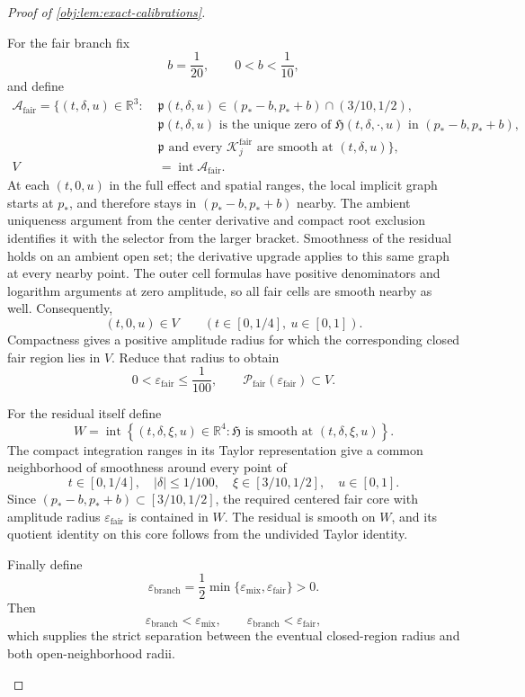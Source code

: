 \documentclass[11pt]{article}
\begin{document}
\begin{proof}[Proof of \cref{obj:lem:exact-calibrations}]
\begin{enumerate}
For the fair branch fix
\[
b=\frac1{20},\qquad 0<b<\frac1{10},
\]
and define
\[
\begin{aligned}
\mathcal A_{\mathrm{fair}}
=\bigl\{(t,\delta,u)\in\mathbb R^3:\;&
\mathfrak p(t,\delta,u)\in(p_*-b,p_*+b)\cap(3/10,1/2),\\
&\mathfrak p(t,\delta,u)
\text{ is the unique zero of }
\mathfrak H(t,\delta,\cdot,u)
\text{ in }(p_*-b,p_*+b),\\
&\mathfrak p\text{ and every }\mathcal K^{\mathrm{fair}}_j
\text{ are smooth at }(t,\delta,u)\bigr\},\\
V&=\operatorname{int}\mathcal A_{\mathrm{fair}}.
\end{aligned}
\]
At each \((t,0,u)\) in the full effect and spatial ranges, the local implicit graph starts at \(p_*\), and therefore stays in
\((p_*-b,p_*+b)\) nearby. The ambient uniqueness argument from the center derivative and compact root exclusion identifies it with the selector from the larger bracket. Smoothness of the residual holds on an ambient open set; the derivative upgrade applies to this same graph at every nearby point. The outer cell formulas have positive denominators and logarithm arguments at zero amplitude, so all fair cells are smooth nearby as well. Consequently,
\[
(t,0,u)\in V
\qquad(t\in[0,1/4],\ u\in[0,1]).
\]
Compactness gives a positive amplitude radius for which the corresponding closed fair region lies in \(V\). Reduce that radius to obtain
\[
0<\varepsilon_{\mathrm{fair}}\le\frac1{100},
\qquad
\mathcal P_{\mathrm{fair}}(\varepsilon_{\mathrm{fair}})\subset V.
\]

For the residual itself define
\[
W=
\operatorname{int}
\left\{
(t,\delta,\xi,u)\in\mathbb R^4:
\mathfrak H\text{ is smooth at }(t,\delta,\xi,u)
\right\}.
\]
The compact integration ranges in its Taylor representation give a common neighborhood of smoothness around every point of
\[
t\in[0,1/4],\quad |\delta|\le1/100,\quad
\xi\in[3/10,1/2],\quad u\in[0,1].
\]
Since
\((p_*-b,p_*+b)\subset[3/10,1/2]\), the required centered fair core with amplitude radius \(\varepsilon_{\mathrm{fair}}\) is contained in \(W\). The residual is smooth on \(W\), and its quotient identity on this core follows from the undivided Taylor identity.

Finally define
\[
\varepsilon_{\mathrm{branch}}
=\frac12\min\{\varepsilon_{\mathrm{mix}},
             \varepsilon_{\mathrm{fair}}\}>0.
\]
Then
\[
\varepsilon_{\mathrm{branch}}<\varepsilon_{\mathrm{mix}},
\qquad
\varepsilon_{\mathrm{branch}}<\varepsilon_{\mathrm{fair}},
\]
which supplies the strict separation between the eventual closed-region radius and both open-neighborhood radii.


\end{enumerate}
\end{proof}
\end{document}
